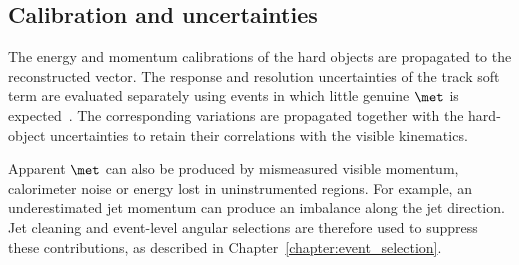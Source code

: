 \subsection{Calibration and uncertainties}

The energy and momentum calibrations of the hard objects are propagated to the reconstructed vector.
The response and resolution uncertainties of the track soft term are evaluated separately using events in which little genuine $\met$ is expected~\cite{ATLAS2025METPerformance}.
The corresponding variations are propagated together with the hard-object uncertainties to retain their correlations with the visible kinematics.

Apparent $\met$ can also be produced by mismeasured visible momentum, calorimeter noise or energy lost in uninstrumented regions.
For example, an underestimated jet momentum can produce an imbalance along the jet direction.
Jet cleaning and event-level angular selections are therefore used to suppress these contributions, as described in Chapter~\ref{chapter:event_selection}.

